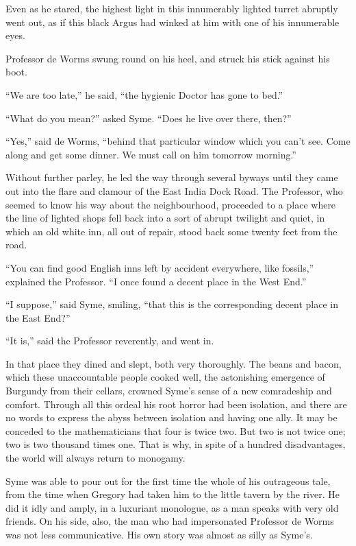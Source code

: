 Even as he stared, the highest light in this innumerably lighted turret abruptly went out, as if this black Argus had winked at him with one of his innumerable eyes.

Professor de Worms swung round on his heel, and struck his stick against his boot.

“We are too late,” he said, “the hygienic Doctor has gone to bed.”

“What do you mean?” asked Syme. “Does he live over there, then?”

“Yes,” said de Worms, “behind that particular window which you can’t see. Come along and get some dinner. We must call on him tomorrow morning.”

Without further parley, he led the way through several byways until they came out into the flare and clamour of the East India Dock Road. The Professor, who seemed to know his way about the neighbourhood, proceeded to a place where the line of lighted shops fell back into a sort of abrupt twilight and quiet, in which an old white inn, all out of repair, stood back some twenty feet from the road.

“You can find good English inns left by accident everywhere, like fossils,” explained the Professor. “I once found a decent place in the West End.”

“I suppose,” said Syme, smiling, “that this is the corresponding decent place in the East End?”

“It is,” said the Professor reverently, and went in.

In that place they dined and slept, both very thoroughly. The beans and bacon, which these unaccountable people cooked well, the astonishing emergence of Burgundy from their cellars, crowned Syme’s sense of a new comradeship and comfort. Through all this ordeal his root horror had been isolation, and there are no words to express the abyss between isolation and having one ally. It may be conceded to the mathematicians that four is twice two. But two is not twice one; two is two thousand times one. That is why, in spite of a hundred disadvantages, the world will always return to monogamy.

Syme was able to pour out for the first time the whole of his outrageous tale, from the time when Gregory had taken him to the little tavern by the river. He did it idly and amply, in a luxuriant monologue, as a man speaks with very old friends. On his side, also, the man who had impersonated Professor de Worms was not less communicative. His own story was almost as silly as Syme’s.

